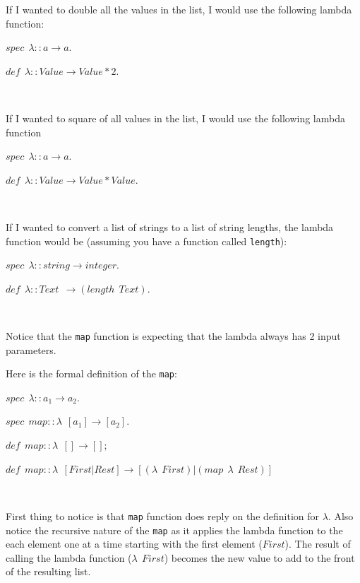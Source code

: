 \documentclass[
]{book}
\begin{document}
If I wanted to double all the values in the list, I would use the following lambda function:

\begin{formulabox}
\(spec ~ ~ \lambda : : a \rightarrow a.\)

\(de\mathit{f} ~ ~ \lambda :: Value \rightarrow Value * 2.\)

\end{formulabox}

\(\nonumber\)

If I wanted to square of all values in the list, I would use the following lambda function

\begin{formulabox}
\(spec ~ ~ \lambda :: a \rightarrow a.\)

\(de\mathit{f} ~ ~ \lambda :: Value \rightarrow Value * Value.\)

\end{formulabox}

\(\nonumber\)

If I wanted to convert a list of strings to a list of string lengths, the lambda function would be (assuming you have a function called \texttt{length}):

\begin{formulabox}
\(spec ~ ~ \lambda :: string \rightarrow integer.\)

\(de\mathit{f} ~ ~ \lambda :: Text ~ ~ \rightarrow (length ~ ~ Text).\)

\end{formulabox}

\(\nonumber\)

Notice that the \texttt{map} function is expecting that the lambda always has 2 input parameters.

Here is the formal definition of the \texttt{map}:

\begin{formulabox}
\(spec ~ ~ \lambda :: a_1 \rightarrow a_2.\)

\(spec ~ ~ map :: \lambda ~ ~ [a_1]\rightarrow [a_2].\)

\(de\mathit{f} ~ ~ map :: \lambda ~ ~ [] \rightarrow [];\)

\(de\mathit{f} ~ ~ map :: \lambda ~ ~ [First | Rest] \rightarrow [(\lambda ~ ~ First)|(map ~ ~ \lambda ~ ~ Rest)]\)

\end{formulabox}

\(\nonumber\)

First thing to notice is that \texttt{map} function does reply on the definition for \(\lambda\). Also notice the recursive nature of the \texttt{map} as it applies the lambda function to the each element one at a time starting with the first element (\(First\)). The result of calling the lambda function (\(\lambda ~ ~ First\)) becomes the new value to add to the front of the resulting list.
\end{document}

